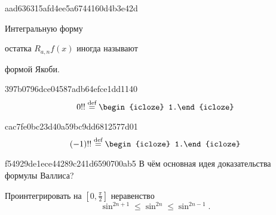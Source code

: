 \begin{note}{aad636315afd4ee5a6744160d4b3e42d}
    \begin{icloze}{2}Интегральную форму\end{icloze} остатка \({ R_{a,n}f(x) }\) иногда называют \begin{icloze}{1}формой Якоби.\end{icloze}
\end{note}

\begin{note}{397b0796dce04587adb64efce1dd1140}
    \[
        0!! \overset{\text{def}}= \begin{icloze}{1}1.\end{icloze}
    \]
\end{note}

\begin{note}{cac7fe0bc23d40a59bc9dd6812577d01}
    \[
        (-1)!! \overset{\text{def}}= \begin{icloze}{1}1.\end{icloze}
    \]
\end{note}


\begin{note}{f54929de1ece44289c241d6590700ab5}
    В чём  основная идея доказательства формулы Валлиса?

    \begin{cloze}{1}
        Проинтегрировать на \({ [0, \frac{\pi}{2}] }\) неравенство
        \[
            \sin^{2n + 1} \leqslant  \sin^{2n} \leqslant \sin^{2n - 1}.
        \]
    \end{cloze}
\end{note}

